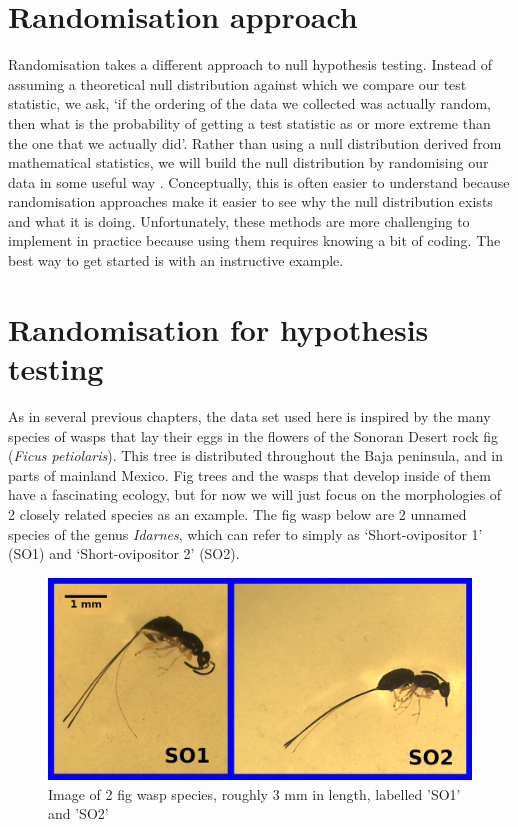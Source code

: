\documentclass[
]{scrbook}
\begin{document}
\hypertarget{randomisation-approach}{%
\section{Randomisation approach}\label{randomisation-approach}}

Randomisation takes a different approach to null hypothesis testing.
Instead of assuming a theoretical null distribution against which we compare our test statistic, we ask, `if the ordering of the data we collected was actually random, then what is the probability of getting a test statistic as or more extreme than the one that we actually did'.
Rather than using a null distribution derived from mathematical statistics, we will build the null distribution by randomising our data in some useful way \citep{Manly2007}.
Conceptually, this is often easier to understand because randomisation approaches make it easier to see why the null distribution exists and what it is doing.
Unfortunately, these methods are more challenging to implement in practice because using them requires knowing a bit of coding.
The best way to get started is with an instructive example.

\hypertarget{randomisation-for-hypothesis-testing}{%
\section{Randomisation for hypothesis testing}\label{randomisation-for-hypothesis-testing}}

As in several previous chapters, the data set used here is inspired by the many species of wasps that lay their eggs in the flowers of the Sonoran Desert rock fig (\emph{Ficus petiolaris}).
This tree is distributed throughout the Baja peninsula, and in parts of mainland Mexico.
Fig trees and the wasps that develop inside of them have a fascinating ecology, but for now we will just focus on the morphologies of 2 closely related species as an example.
The fig wasp below are 2 unnamed species of the genus \emph{Idarnes}, which can refer to simply as `Short-ovipositor 1' (SO1) and `Short-ovipositor 2' (SO2).

\begin{figure}
\includegraphics[width=1\linewidth]{img/fig_wasps} \caption{Image of 2 fig wasp species, roughly 3 mm in length, labelled 'SO1' and 'SO2'}\label{fig:unnamed-chunk-180}
\end{figure}
\end{document}
